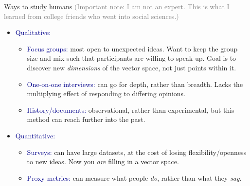\documentclass[aspectratio=169]{beamer}
\begin{document}
\begin{frame}{Ways to study humans}
\vspace{0.1 cm}
\textcolor{gray}{\scriptsize (Important note: I am not an expert. This is what I learned from college friends who went into social sciences.)}

\large
\vspace{0.1 cm}
\begin{itemize}\setlength{\itemsep}{0.25 cm}
\item \textcolor{darkblue}{Qualitative:}

\vspace{0.05 cm}
\begin{itemize}\large\setlength{\itemsep}{0.15 cm}
\item \textcolor{darkblue}{Focus groups:} \normalsize most open to unexpected ideas. Want to keep the group size and mix such that participants are willing to speak up. Goal is to discover new {\it dimensions} of the vector space, not just points within it. \large

\item \textcolor{darkblue}{One-on-one interviews:} \normalsize can go for depth, rather than breadth. Lacks the multiplying effect of responding to differing opinions. \large

\item \textcolor{darkblue}{History/documents:} \normalsize observational, rather than experimental, but this method can reach further into the past. \large
\end{itemize}

\item \textcolor{darkblue}{Quantitative:}

\vspace{0.05 cm}
\begin{itemize}\large\setlength{\itemsep}{0.15 cm}
\item \textcolor{darkblue}{Surveys:} \normalsize can have large datasets, at the cost of losing flexibility/openness to new ideas. Now you {\it are} filling in a vector space. \large

\item \textcolor{darkblue}{Proxy metrics:} \normalsize can measure what people {\it do}, rather than what they {\it say}. \large
\end{itemize}

\end{itemize}
\end{frame}
\end{document}
